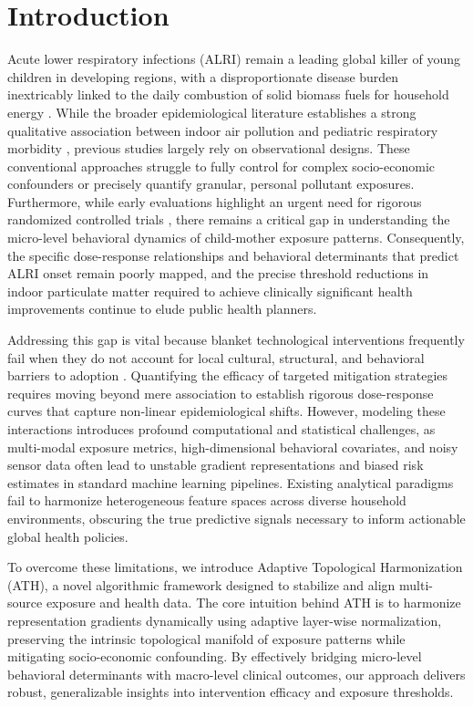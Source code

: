 \documentclass[10pt,twocolumn]{article}
\begin{document}
\section{Introduction}
Acute lower respiratory infections (ALRI) remain a leading global killer of young children in developing regions, with a disproportionate disease burden inextricably linked to the daily combustion of solid biomass fuels for household energy \cite{target_ref}. While the broader epidemiological literature establishes a strong qualitative association between indoor air pollution and pediatric respiratory morbidity \cite{ref_4}, previous studies largely rely on observational designs. These conventional approaches struggle to fully control for complex socio-economic confounders or precisely quantify granular, personal pollutant exposures. Furthermore, while early evaluations highlight an urgent need for rigorous randomized controlled trials \cite{ref_1, ref_3}, there remains a critical gap in understanding the micro-level behavioral dynamics of child-mother exposure patterns. Consequently, the specific dose-response relationships and behavioral determinants that predict ALRI onset remain poorly mapped, and the precise threshold reductions in indoor particulate matter required to achieve clinically significant health improvements continue to elude public health planners.

Addressing this gap is vital because blanket technological interventions frequently fail when they do not account for local cultural, structural, and behavioral barriers to adoption \cite{ref_2, ref_5}. Quantifying the efficacy of targeted mitigation strategies requires moving beyond mere association to establish rigorous dose-response curves that capture non-linear epidemiological shifts. However, modeling these interactions introduces profound computational and statistical challenges, as multi-modal exposure metrics, high-dimensional behavioral covariates, and noisy sensor data often lead to unstable gradient representations and biased risk estimates in standard machine learning pipelines. Existing analytical paradigms fail to harmonize heterogeneous feature spaces across diverse household environments, obscuring the true predictive signals necessary to inform actionable global health policies.

To overcome these limitations, we introduce Adaptive Topological Harmonization (ATH), a novel algorithmic framework designed to stabilize and align multi-source exposure and health data. The core intuition behind ATH is to harmonize representation gradients dynamically using adaptive layer-wise normalization, preserving the intrinsic topological manifold of exposure patterns while mitigating socio-economic confounding. By effectively bridging micro-level behavioral determinants with macro-level clinical outcomes, our approach delivers robust, generalizable insights into intervention efficacy and exposure thresholds.
\end{document}
